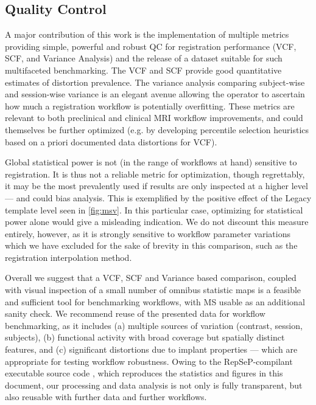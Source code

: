\subsection{Quality Control}

A major contribution of this work is the implementation of multiple metrics providing simple, powerful and robust QC for registration performance (VCF, SCF, and Variance Analysis) and the release of a dataset \cite{irsabi_bidsdata} suitable for such multifaceted benchmarking.
The VCF and SCF provide good quantitative estimates of distortion prevalence.
The variance analysis comparing subject-wise and session-wise variance is an elegant avenue allowing the operator to ascertain how much a registration workflow is potentially overfitting.
These metrics are relevant to both preclinical and clinical MRI workflow improvements, and could themselves be further optimized (e.g. by developing percentile selection heuristics based on a priori documented data distortions for VCF).

Global statistical power is not (in the range of workflows at hand) sensitive to registration.
It is thus not a reliable metric for optimization, though regrettably, it may be the most prevalently used if results are only inspected at a higher level --- and could bias analysis.
This is exemplified by the positive effect of the Legacy template level seen in \cref{fig:msv}.
In this particular case, optimizing for statistical power alone would give a misleading indication.
We do not discount this measure entirely, however, as it is strongly sensitive to workflow parameter variations which we have excluded for the sake of brevity in this comparison, such as the registration interpolation method.

Overall we suggest that a VCF, SCF and Variance based comparison, coupled with visual inspection of a small number of omnibus statistic maps is a feasible and sufficient tool for benchmarking workflows, with MS usable as an additional sanity check.
We recommend reuse of the presented data for workflow benchmarking, as it includes (a) multiple sources of variation (contrast, session, subjects), (b) functional activity with broad coverage but spatially distinct features, and (c) significant distortions due to implant properties --- which are appropriate for testing workflow robustness.
Owing to the RepSeP-compilant executable source code \cite{source}, which reproduces the statistics and figures in this document, our processing and data analysis is not only is fully transparent, but also reusable with further data and further workflows.

